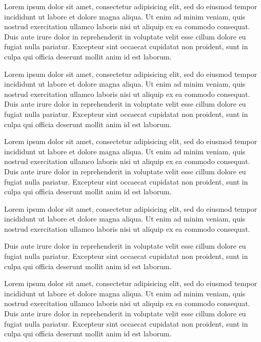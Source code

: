 \documentclass[
	12pt,				%
	twoside,			%
	a4paper,			%
	chapter=TITLE,		%
	english,			%
	brazil				%
	]{tcc}
\begin{document}
	Lorem ipsum dolor sit amet, consectetur adipisicing elit, sed do eiusmod
	tempor incididunt ut labore et dolore magna aliqua. Ut enim ad minim veniam,
	quis nostrud exercitation ullamco laboris nisi ut aliquip ex ea commodo
	consequat. Duis aute irure dolor in reprehenderit in voluptate velit esse
	cillum dolore eu fugiat nulla pariatur. Excepteur sint occaecat cupidatat non
	proident, sunt in culpa qui officia deserunt mollit anim id est laborum.

	Lorem ipsum dolor sit amet, consectetur adipisicing elit, sed do eiusmod
	tempor incididunt ut labore et dolore magna aliqua. Ut enim ad minim veniam,
	quis nostrud exercitation ullamco laboris nisi ut aliquip ex ea commodo
	consequat. Duis aute irure dolor in reprehenderit in voluptate velit esse
	cillum dolore eu fugiat nulla pariatur. Excepteur sint occaecat cupidatat non
	proident, sunt in culpa qui officia deserunt mollit anim id est laborum.

	Lorem ipsum dolor sit amet, consectetur adipisicing elit, sed do eiusmod
	tempor incididunt ut labore et dolore magna aliqua. Ut enim ad minim veniam,
	quis nostrud exercitation ullamco laboris nisi ut aliquip ex ea commodo
	consequat. Duis aute irure dolor in reprehenderit in voluptate velit esse
	cillum dolore eu fugiat nulla pariatur. Excepteur sint occaecat cupidatat non
	proident, sunt in culpa qui officia deserunt mollit anim id est laborum.

	Lorem ipsum dolor sit amet, consectetur adipisicing elit, sed do eiusmod
	tempor incididunt ut labore et dolore magna aliqua. Ut enim ad minim veniam,
	quis nostrud exercitation ullamco laboris nisi ut aliquip ex ea commodo
	consequat.

	

	 Duis aute irure dolor in reprehenderit in voluptate velit esse
	cillum dolore eu fugiat nulla pariatur. Excepteur sint occaecat cupidatat non
	proident, sunt in culpa qui officia deserunt mollit anim id est laborum.

	Lorem ipsum dolor sit amet, consectetur adipisicing elit, sed do eiusmod
	tempor incididunt ut labore et dolore magna aliqua. Ut enim ad minim veniam,
	quis nostrud exercitation ullamco laboris nisi ut aliquip ex ea commodo
	consequat. Duis aute irure dolor in reprehenderit in voluptate velit esse
	cillum dolore eu fugiat nulla pariatur. Excepteur sint occaecat cupidatat non
	proident, sunt in culpa qui officia deserunt mollit anim id est laborum.

\end{document}

